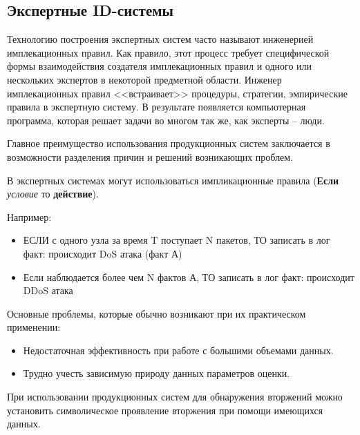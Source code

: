 \subsection{Экспертные ID-системы}

Технологию построения экспертных систем часто называют инженерией имплекационных правил. Как правило, 
этот процесс требует специфической формы взаимодействия создателя имплекационных правил и одного 
или нескольких экспертов в некоторой предметной области. Инженер имплекационных правил <<встраивает>>
процедуры, стратегии, эмпирические правила в экспертную систему. В результате появляется 
компьютерная программа, которая решает задачи во многом так же, как эксперты -- люди.
\autocite{IDSystem}

Главное преимущество использования продукционных систем заключается в возможности разделения причин и 
решений возникающих проблем.

В экспертных системах могут использоваться импликационные правила (\textbf{Если} \textit{условие} то 
\textbf{действие}).

Например:
\begin{itemize}
	\item ЕСЛИ с одного узла за время T поступает N пакетов, ТО записать в лог факт: 
	происходит DoS атака (факт А)
	
	\item Если наблюдается более чем N фактов А, ТО записать в лог факт: происходит DDoS атака
\end{itemize}

Основные проблемы, которые обычно возникают при их практическом применении:
\begin{itemize}
    \item Недостаточная эффективность при работе с большими объемами данных.
    \item Трудно учесть зависимую природу данных параметров оценки.
\end{itemize}

При использовании продукционных систем для обнаружения вторжений можно установить символическое 
проявление вторжения при помощи имеющихся данных.

